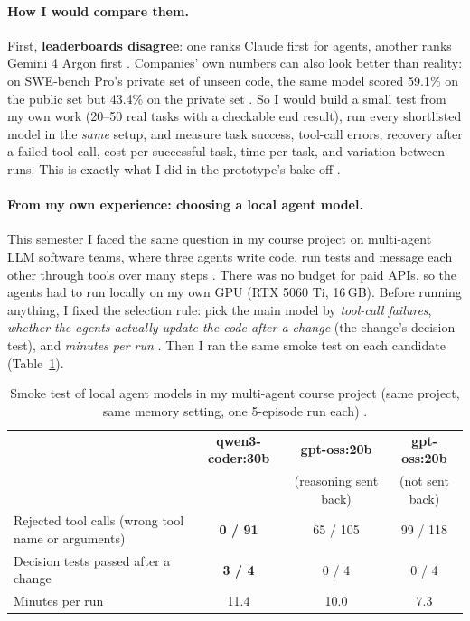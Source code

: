 \paragraph{How I would compare them.} First, \textbf{leaderboards disagree}: one ranks Claude first for agents, another
ranks Gemini 4 Argon first \citep{geotoolbox2026,benchlmagents2026}. Companies' own numbers can also look better than
reality: on SWE-bench Pro's private set of unseen code, the same model scored 59.1\% on the public set but 43.4\% on the
private set \citep{morphswepro}. So I would build a small test from my own work (20--50 real tasks with a checkable end
result), run every shortlisted model in the \emph{same} setup, and measure task success, tool-call errors, recovery after
a failed tool call, cost per successful task, time per task, and variation between runs. This is exactly what I did in
the prototype's bake-off .

\paragraph{From my own experience: choosing a local agent model.} This semester I faced the same question in my
course project on multi-agent LLM software teams, where three agents write code, run tests and message each other
through tools over many steps \citep{agenticlog}. There was no budget for paid APIs, so the agents had to run locally
on my own GPU (RTX 5060 Ti, 16\,GB). Before running anything, I fixed the selection rule: pick the main model by
\emph{tool-call failures}, \emph{whether the agents actually update the code after a change} (the change's decision test),
and \emph{minutes per run} \citep{agentic0043}. Then I ran the same smoke test on each candidate (Table~\ref{tab:q1local}).

\begin{table}[H]
\centering
\small
\caption[Smoke test of local agent models in my multi-agent course project (same project, same memory setting, one 5-episode
run each).]{Smoke test of local agent models in my multi-agent course project (same project, same memory setting, one 5-episode
run each) \citep{agentic0049,agenticlog}.}
\label{tab:q1local}
\begin{tabular}{@{}lccc@{}}
\toprule
 & \textbf{qwen3-coder:30b} & \textbf{gpt-oss:20b} & \textbf{gpt-oss:20b} \\
 & & (reasoning sent back) & (not sent back) \\
\midrule
Rejected tool calls (wrong tool name or arguments) & \textbf{0 / 91} & 65 / 105 & 99 / 118 \\
Decision tests passed after a change & \textbf{3 / 4} & 0 / 4 & 0 / 4 \\
Minutes per run & 11.4 & 10.0 & 7.3 \\
\bottomrule
\end{tabular}
\end{table}

